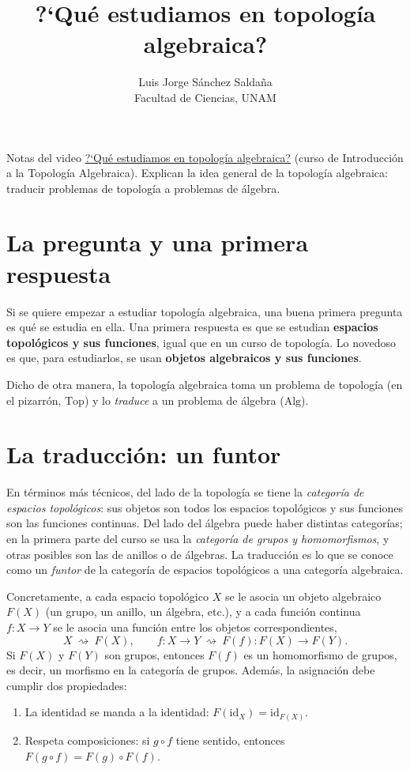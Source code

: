 \documentclass[11pt]{article}
\title{?`Qué estudiamos en topología algebraica?}
\author{Luis Jorge Sánchez Saldaña\\[2pt]\small Facultad de Ciencias, UNAM}
\date{}
\begin{document}
\maketitle

\noindent\small Notas del video
\href{https://www.youtube.com/watch?v=h9I4SazsV6E}{\guillemotleft{}?`Qué estudiamos en topología algebraica?\guillemotright{}}
(curso de Introducción a la Topología Algebraica). Explican la idea general de la topología algebraica: traducir problemas de topología a problemas de álgebra.
\normalsize

\section*{La pregunta y una primera respuesta}

Si se quiere empezar a estudiar topología algebraica, una buena primera pregunta es qué se estudia en ella. Una primera respuesta es que se estudian \textbf{espacios topológicos y sus funciones}, igual que en un curso de topología. Lo novedoso es que, para estudiarlos, se usan \textbf{objetos algebraicos y sus funciones}.

Dicho de otra manera, la topología algebraica toma un problema de topología (en el pizarrón, $\mathrm{Top}$) y lo \emph{traduce} a un problema de álgebra ($\mathrm{Alg}$).

\section*{La traducción: un funtor}

En términos más técnicos, del lado de la topología se tiene la \emph{categoría de espacios topológicos}: sus objetos son todos los espacios topológicos y sus funciones son las funciones continuas. Del lado del álgebra puede haber distintas categorías; en la primera parte del curso se usa la \emph{categoría de grupos y homomorfismos}, y otras posibles son las de anillos o de álgebras. La traducción es lo que se conoce como un \emph{funtor} de la categoría de espacios topológicos a una categoría algebraica.

Concretamente, a cada espacio topológico $X$ se le asocia un objeto algebraico $F(X)$ (un grupo, un anillo, un álgebra, etc.), y a cada función continua $f\colon X\to Y$ se le asocia una función entre los objetos correspondientes,
\[
  X\ \rightsquigarrow\ F(X),\qquad
  f\colon X\to Y\ \rightsquigarrow\ F(f)\colon F(X)\to F(Y).
\]
Si $F(X)$ y $F(Y)$ son grupos, entonces $F(f)$ es un homomorfismo de grupos, es decir, un morfismo en la categoría de grupos. Además, la asignación debe cumplir dos propiedades:
\begin{enumerate}
  \item La identidad se manda a la identidad: $F(\mathrm{id}_X)=\mathrm{id}_{F(X)}$.
  \item Respeta composiciones: si $g\circ f$ tiene sentido, entonces $F(g\circ f)=F(g)\circ F(f)$.
\end{enumerate}
\end{document}
